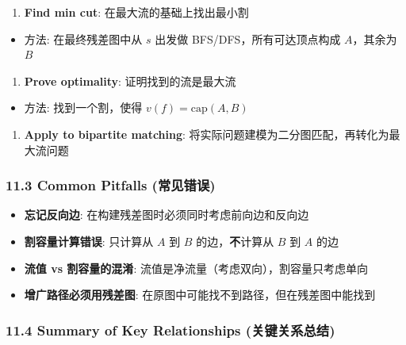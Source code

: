 \documentclass[10pt,a4paper,openany]{ctexbook}
\theoremstyle{definition}
\theoremstyle{remark}
\begin{document}
\begin{enumerate}
\item \textbf{Find min cut}: 在最大流的基础上找出最小割
\end{enumerate}

\begin{itemize}
\item 方法: 在最终残差图中从 $s$ 出发做 BFS/DFS，所有可达顶点构成 $A$，其余为 $B$

\end{itemize}

\begin{enumerate}
\item \textbf{Prove optimality}: 证明找到的流是最大流
\end{enumerate}

\begin{itemize}
\item 方法: 找到一个割，使得 $v(f) = \text{cap}(A,B)$

\end{itemize}

\begin{enumerate}
\item \textbf{Apply to bipartite matching}: 将实际问题建模为二分图匹配，再转化为最大流问题

\end{enumerate}

\subsubsection{11.3 Common Pitfalls (常见错误)}

\begin{itemize}
\item \textbf{忘记反向边}: 在构建残差图时必须同时考虑前向边和反向边
\item \textbf{割容量计算错误}: 只计算从 $A$ 到 $B$ 的边，\textbf{不}计算从 $B$ 到 $A$ 的边
\item \textbf{流值 vs 割容量的混淆}: 流值是净流量（考虑双向），割容量只考虑单向
\item \textbf{增广路径必须用残差图}: 在原图中可能找不到路径，但在残差图中能找到

\end{itemize}

\subsubsection{11.4 Summary of Key Relationships (关键关系总结)}
\end{document}
